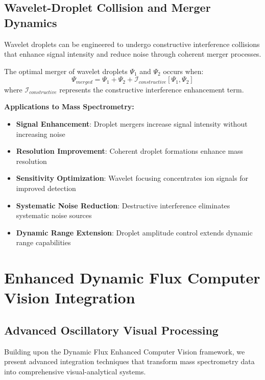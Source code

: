 \subsection{Wavelet-Droplet Collision and Merger Dynamics}

\begin{theorem}
Wavelet droplets can be engineered to undergo constructive interference collisions that enhance signal intensity and reduce noise through coherent merger processes.
\end{theorem}

\begin{definition}
The optimal merger of wavelet droplets $\Psi_1$ and $\Psi_2$ occurs when:
$$\Psi_{merged} = \Psi_1 + \Psi_2 + \mathcal{I}_{constructive}[\Psi_1, \Psi_2]$$
where $\mathcal{I}_{constructive}$ represents the constructive interference enhancement term.
\end{definition}

\textbf{Applications to Mass Spectrometry:}
\begin{itemize}
\item \textbf{Signal Enhancement}: Droplet mergers increase signal intensity without increasing noise
\item \textbf{Resolution Improvement}: Coherent droplet formations enhance mass resolution
\item \textbf{Sensitivity Optimization}: Wavelet focusing concentrates ion signals for improved detection
\item \textbf{Systematic Noise Reduction}: Destructive interference eliminates systematic noise sources
\item \textbf{Dynamic Range Extension}: Droplet amplitude control extends dynamic range capabilities
\end{itemize}

\section{Enhanced Dynamic Flux Computer Vision Integration}

\subsection{Advanced Oscillatory Visual Processing}

Building upon the Dynamic Flux Enhanced Computer Vision framework, we present advanced integration techniques that transform mass spectrometry data into comprehensive visual-analytical systems.

